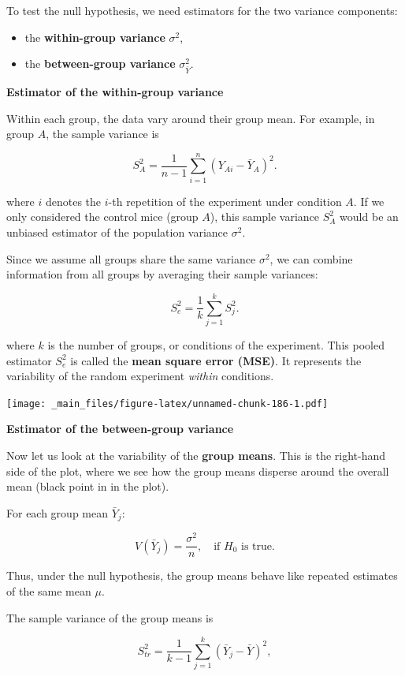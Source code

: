 \documentclass[
]{book}
\providecommand{\tightlist}{%
  \setlength{\itemsep}{0pt}\setlength{\parskip}{0pt}}
\begin{document}
To test the null hypothesis, we need estimators for the two variance components:

\begin{itemize}
\tightlist
\item
  the \textbf{within-group variance} \(\sigma^2\),\\
\item
  the \textbf{between-group variance} \(\sigma^2_{\bar{Y}}\).
\end{itemize}

\textbf{Estimator of the within-group variance}

Within each group, the data vary around their group mean. For example, in group \(A\), the sample variance is

\[
S_A^2=\frac{1}{n-1} \sum_{i=1}^{n} (Y_{Ai}-\bar{Y}_{A})^2.
\]

where \(i\) denotes the \(i\)-th repetition of the experiment under condition \(A\). If we only considered the control mice (group \(A\)), this sample variance \(S_A^2\) would be an unbiased estimator of the population variance \(\sigma^2\).

Since we assume all groups share the same variance \(\sigma^2\), we can combine information from all groups by averaging their sample variances:

\[
S_e^2 = \frac{1}{k}\sum_{j=1}^k S_j^2.
\]

where \(k\) is the number of groups, or conditions of the experiment. This pooled estimator \(S_e^2\) is called the \textbf{mean square error (MSE)}. It represents the variability of the random experiment \emph{within} conditions.

\texttt{[image: \_main\_files/figure-latex/unnamed-chunk-186-1.pdf]}

\textbf{Estimator of the between-group variance}

Now let us look at the variability of the \textbf{group means}. This is the right-hand side of the plot, where we see how the group means disperse around the overall mean (black point in in the plot).

For each group mean \(\bar{Y}_j\):

\[
V(\bar{Y}_j) = \frac{\sigma^2}{n}, \quad \text{if } H_0 \text{ is true}.
\]

Thus, under the null hypothesis, the group means behave like repeated estimates of the same mean \(\mu\).

The sample variance of the group means is

\[
S^2_{tr}=\frac{1}{k-1} \sum_{j=1}^k (\bar{Y}_{j}-\bar{Y})^2,
\]
\end{document}

